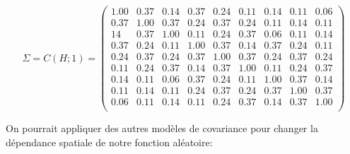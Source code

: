 \documentclass[10pt]{article} %
\begin{document}
$$
\Sigma = C(H; 1) =
\begin{pmatrix}
    1.00 & 0.37 & 0.14 & 0.37 & 0.24 & 0.11 & 0.14 & 0.11 & 0.06 \\
    0.37 & 1.00 & 0.37 & 0.24 & 0.37 & 0.24 & 0.11 & 0.14 & 0.11 \\
    14 & 0.37 & 1.00 & 0.11 & 0.24 & 0.37 & 0.06 & 0.11 & 0.14 \\
    0.37 & 0.24 & 0.11 & 1.00 & 0.37 & 0.14 & 0.37 & 0.24 & 0.11 \\
    0.24 & 0.37 & 0.24 & 0.37 & 1.00 & 0.37 & 0.24 & 0.37 & 0.24 \\
    0.11 & 0.24 & 0.37 & 0.14 & 0.37 & 1.00 & 0.11 & 0.24 & 0.37 \\
    0.14 & 0.11 & 0.06 & 0.37 & 0.24 & 0.11 & 1.00 & 0.37 & 0.14 \\
    0.11 & 0.14 & 0.11 & 0.24 & 0.37 & 0.24 & 0.37 & 1.00 & 0.37 \\
    0.06 & 0.11 & 0.14 & 0.11 & 0.24 & 0.37 & 0.14 & 0.37 & 1.00 \\
\end{pmatrix}
$$

On pourrait appliquer des autres modèles de covariance pour changer la dépendance spatiale de notre fonction aléatoire:
\end{document}
